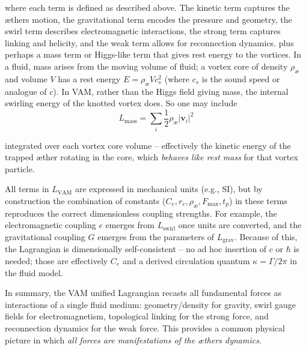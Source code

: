 where each term is defined as described above. The kinetic term captures the æther\rqs s motion, the gravitational term encodes the pressure and geometry, the swirl term describes electromagnetic interactions, the strong term captures linking and helicity, and the weak term allows for reconnection dynamics.
plus perhaps a mass term or Higgs-like term that gives rest energy to the vortices. In a fluid, mass arises from the moving volume of fluid; a vortex core of density $\rho_{\text{\ae}}$ and volume $V$ has a rest energy $E = \rho_{\text{\ae}} V c_s^2$ (where $c_s$ is the sound speed or analogue of $c$). In VAM, rather than the Higgs field giving mass, the internal swirling energy of the knotted vortex does. So one may include
\[
    L_{\text{mass}} = \sum_i \frac{1}{2}\rho_{\text{\ae}} |\mathbf{v}_i|^2
\]

integrated over each vortex core volume – effectively the kinetic energy of the trapped æther rotating in the core, which \textit{behaves like rest mass} for that vortex particle.

All terms in $L_{\text{VAM}}$ are expressed in mechanical units (e.g., SI), but by construction the combination of constants ($C_e, r_c, \rho_{\text{\ae}}, F_{\max}, t_p$) in these terms reproduces the correct dimensionless coupling strengths. For example, the electromagnetic coupling $e$ emerges from $L_{\text{swirl}}$ once units are converted, and the gravitational coupling $G$ emerges from the parameters of $L_{\text{grav}}$. Because of this, the Lagrangian is dimensionally self-consistent – no ad hoc insertion of $c$ or $\hbar$ is needed; those are effectively $C_e$ and a derived circulation quantum $\kappa = \Gamma/2\pi$ in the fluid model.

In summary, the VAM unified Lagrangian recasts all fundamental forces as interactions of a single fluid medium: geometry/density for gravity, swirl gauge fields for electromagnetism, topological linking for the strong force, and reconnection dynamics for the weak force. This provides a common physical picture in which \textit{all forces are manifestations of the æther\rqs s dynamics}.
